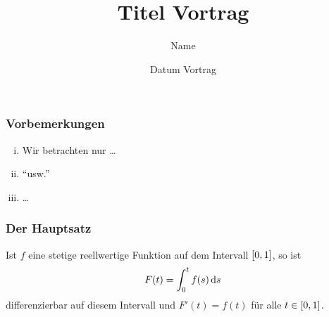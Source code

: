 \documentclass[%
	,ngerman
	,hyperref={%
		,bookmarks
		,colorlinks=true
		,citecolor=blue
		,linkcolor=blue
		,urlcolor=blue
			}
	,smaller
	]{beamer}
\begin{document}
%
\title{Titel Vortrag}
\author{Name}
\date{Datum Vortrag} 

\frame{\titlepage}

\begin{frame} 		
	\frametitle{Vorbemerkungen}
	
	\begin{enumerate}[(i)]
		\item 
		Wir betrachten nur \ldots
		
		\item
		\enquote{usw.}
		
		\item
		\ldots
		
	\end{enumerate}
\end{frame}
\begin{frame}
	\frametitle{Der Hauptsatz}

\begin{theorem}\label{prop:hauptsatz}
%	
Ist $ f $ eine stetige reellwertige Funktion auf dem Intervall $ \left[ 0,1 \right] $, so ist
%
\[
  	F( t ) = \int_{ 0 }^{ t } f(s) \mathop{}\!\mathrm{d}{s}
\]
%
differenzierbar auf diesem Intervall und $ F'(t) = f(t) $ für alle $ t \in \left[ 0,1 \right] $.
\end{theorem}

\end{frame}
\end{document}
